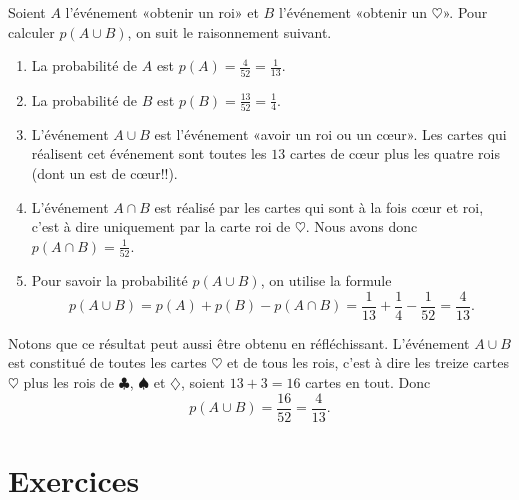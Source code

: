 \begin{example}
    Soient \( A\) l'événement «obtenir un roi» et \( B\) l'événement «obtenir un \( \heartsuit\)». Pour calculer \( p(A\cup B)\), on suit le raisonnement suivant.
    \begin{enumerate}
        \item
            La probabilité de \( A\) est \( p(A)=\frac{ 4 }{ 52 }=\frac{1}{ 13 }\). 
        \item
            La probabilité de \( B\) est \( p(B)=\frac{ 13 }{ 52 }=\frac{1}{ 4 }\).
        \item
            L'événement \( A\cup B\) est l'événement «avoir un roi ou un cœur». Les cartes qui réalisent cet événement sont toutes les \( 13\) cartes de cœur plus les quatre rois (dont un est de cœur!!). 
        \item
            L'événement \( A\cap B\) est réalisé par les cartes qui sont à la fois cœur et roi, c'est à dire uniquement par la carte roi de \( \heartsuit\). Nous avons donc \( p(A\cap B)=\frac{1}{ 52 }\).
        \item
            Pour savoir la probabilité \( p(A\cup B)\), on utilise la formule
            \begin{equation}
                p(A\cup B)=p(A)+p(B)-p(A\cap B)=\frac{1}{ 13 }+\frac{1}{ 4 }-\frac{1}{ 52 }=\frac{ 4 }{ 13 }.
            \end{equation}
    \end{enumerate}
    Notons que ce résultat peut aussi être obtenu en réfléchissant. L'événement \( A\cup B\) est constitué de toutes les cartes \( \heartsuit\) et de tous les rois, c'est à dire les treize cartes \( \heartsuit\) plus les rois de \( \clubsuit\), \( \spadesuit\) et \( \diamondsuit\), soient \( 13+3=16\) cartes en tout. Donc
    \begin{equation}
        p(A\cup B)=\frac{ 16 }{ 52 }=\frac{ 4 }{ 13 }.
    \end{equation}
\end{example}

\section{Exercices}


